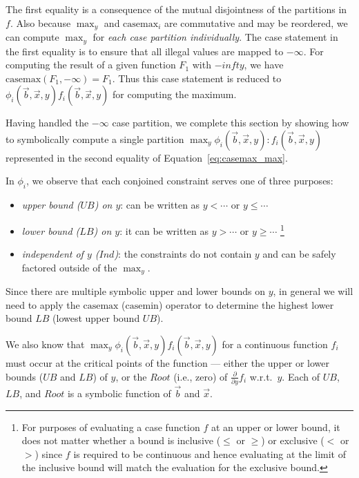 \documentclass[twoside,11pt]{article}
\newcommand{\casemax}{\mathrm{casemax}}
\newcommand{\casemin}{\mathrm{casemin}}
\newcommand{\UB}{\mathit{UB}}
\newcommand{\LB}{\mathit{LB}}
\newcommand{\IND}{\mathit{Ind}}
\newcommand{\Root}{\mathit{Root}}
\begin{document}
The first equality is a consequence of the mutual disjointness of the partitions in $f$.  
Also because 
$\max_y$ and $\casemax_i$ are commutative and may be reordered,
we can compute $\max_y$ for \emph{each case partition
individually}.  
The case statement in the first equality is to ensure that all illegal values are mapped to $-\infty$. For computing the result of a given function $F_1$ with $-infty$, we have $\casemax(F_1, -\infty) = F_1$. Thus this case statement is reduced to $\phi_i(\vec{b},\vec{x},y) f_i(\vec{b},\vec{x},y)$ for computing the maximum. 

Having handled the $-\infty$ case partition, we complete this section by
showing how to symbolically compute a single partition 
$\max_y \phi_i(\vec{b},\vec{x},y): f_i(\vec{b},\vec{x},y)$ represented in the second equality of Equation~\ref{eq:casemax_max}.

In $\phi_i$, we observe that each conjoined constraint serves one of
three purposes: 
\begin{itemize}
\item \emph{upper bound ($\UB$) on $y$}: can be written as $y < \cdots$ or $y \leq \cdots$
\item \emph{lower bound ($\LB$) on $y$}: it can be written as $y >\cdots$ or $y \geq \cdots$
\footnote{For purposes of evaluating
a case function $f$ at an upper or lower bound,
it does not matter whether a bound is inclusive ($\leq$ or $\geq$)
or exclusive ($<$ or $>$) since $f$ is required to be continuous
and hence evaluating at the limit of the inclusive bound will
match the evaluation for the exclusive bound.}
\item \emph{independent of $y$ ($\IND$)}: the constraints do not contain $y$
and can be safely factored outside of the $\max_y$.
\end{itemize}

Since there are multiple symbolic upper and lower
bounds on $y$, in general we will need to apply the $\casemax$
($\casemin$) operator to determine the highest lower bound $\LB$
(lowest upper bound $\UB$).

We also know that $\max_y \phi_i(\vec{b},\vec{x},y)
f_i(\vec{b},\vec{x},y)$ for a continuous function $f_i$ must occur at the critical points of the function --- 
either the upper or lower bounds ($\UB$ and $\LB$) of $y$, 
or the $\Root$ (i.e., zero) of $\frac{\partial}{\partial y} f_i$ 
w.r.t.\ $y$.  Each of $\UB$, $\LB$, and $\Root$
is a symbolic function of $\vec{b}$ and $\vec{x}$. 
\end{document}

